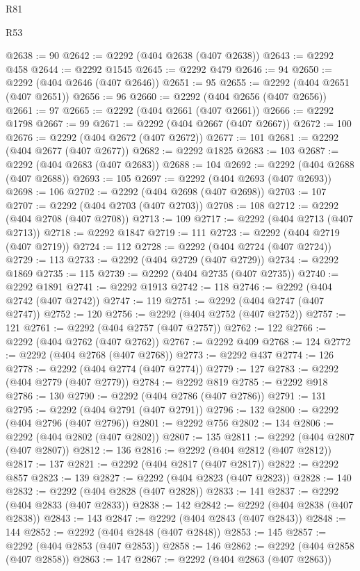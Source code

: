 \begin{lexlean}{R81}
\begin{lexlean}{R53}
\begin{coremodule}
{{{{{{{{{{{{{{{{{{{{{{{{{{{{{{{{{{{{{{{{{{{{{{{{{{{{{{{{{{{{{{{{{{{{{{{{{{{{{{{{{{{{{{{{{{{{{{{{{{{{{{{{{{{{{{{{@2638 := 90
@2642 := @2292 (@404 @2638 (@407 @2638))
@2643 := @2292 @458
@2644 := @2292 @1545
@2645 := @2292 @479
@2646 := 94
@2650 := @2292 (@404 @2646 (@407 @2646))
@2651 := 95
@2655 := @2292 (@404 @2651 (@407 @2651))
@2656 := 96
@2660 := @2292 (@404 @2656 (@407 @2656))
@2661 := 97
@2665 := @2292 (@404 @2661 (@407 @2661))
@2666 := @2292 @1798
@2667 := 99
@2671 := @2292 (@404 @2667 (@407 @2667))
@2672 := 100
@2676 := @2292 (@404 @2672 (@407 @2672))
@2677 := 101
@2681 := @2292 (@404 @2677 (@407 @2677))
@2682 := @2292 @1825
@2683 := 103
@2687 := @2292 (@404 @2683 (@407 @2683))
@2688 := 104
@2692 := @2292 (@404 @2688 (@407 @2688))
@2693 := 105
@2697 := @2292 (@404 @2693 (@407 @2693))
@2698 := 106
@2702 := @2292 (@404 @2698 (@407 @2698))
@2703 := 107
@2707 := @2292 (@404 @2703 (@407 @2703))
@2708 := 108
@2712 := @2292 (@404 @2708 (@407 @2708))
@2713 := 109
@2717 := @2292 (@404 @2713 (@407 @2713))
@2718 := @2292 @1847
@2719 := 111
@2723 := @2292 (@404 @2719 (@407 @2719))
@2724 := 112
@2728 := @2292 (@404 @2724 (@407 @2724))
@2729 := 113
@2733 := @2292 (@404 @2729 (@407 @2729))
@2734 := @2292 @1869
@2735 := 115
@2739 := @2292 (@404 @2735 (@407 @2735))
@2740 := @2292 @1891
@2741 := @2292 @1913
@2742 := 118
@2746 := @2292 (@404 @2742 (@407 @2742))
@2747 := 119
@2751 := @2292 (@404 @2747 (@407 @2747))
@2752 := 120
@2756 := @2292 (@404 @2752 (@407 @2752))
@2757 := 121
@2761 := @2292 (@404 @2757 (@407 @2757))
@2762 := 122
@2766 := @2292 (@404 @2762 (@407 @2762))
@2767 := @2292 @409
@2768 := 124
@2772 := @2292 (@404 @2768 (@407 @2768))
@2773 := @2292 @437
@2774 := 126
@2778 := @2292 (@404 @2774 (@407 @2774))
@2779 := 127
@2783 := @2292 (@404 @2779 (@407 @2779))
@2784 := @2292 @819
@2785 := @2292 @918
@2786 := 130
@2790 := @2292 (@404 @2786 (@407 @2786))
@2791 := 131
@2795 := @2292 (@404 @2791 (@407 @2791))
@2796 := 132
@2800 := @2292 (@404 @2796 (@407 @2796))
@2801 := @2292 @756
@2802 := 134
@2806 := @2292 (@404 @2802 (@407 @2802))
@2807 := 135
@2811 := @2292 (@404 @2807 (@407 @2807))
@2812 := 136
@2816 := @2292 (@404 @2812 (@407 @2812))
@2817 := 137
@2821 := @2292 (@404 @2817 (@407 @2817))
@2822 := @2292 @857
@2823 := 139
@2827 := @2292 (@404 @2823 (@407 @2823))
@2828 := 140
@2832 := @2292 (@404 @2828 (@407 @2828))
@2833 := 141
@2837 := @2292 (@404 @2833 (@407 @2833))
@2838 := 142
@2842 := @2292 (@404 @2838 (@407 @2838))
@2843 := 143
@2847 := @2292 (@404 @2843 (@407 @2843))
@2848 := 144
@2852 := @2292 (@404 @2848 (@407 @2848))
@2853 := 145
@2857 := @2292 (@404 @2853 (@407 @2853))
@2858 := 146
@2862 := @2292 (@404 @2858 (@407 @2858))
@2863 := 147
@2867 := @2292 (@404 @2863 (@407 @2863))
}}}}}}}}}}}}}}}}}}}}}}}}}}}}}}}}}}}}}}}}}}}}}}}}}}}}}}}}}}}}}}}}}}}}}}}}}}}}}}}}}}}}}}}}}}}}}}}}}}}}}}}}}}}}}}}}
\end{coremodule}
\end{lexlean}
\end{lexlean}
